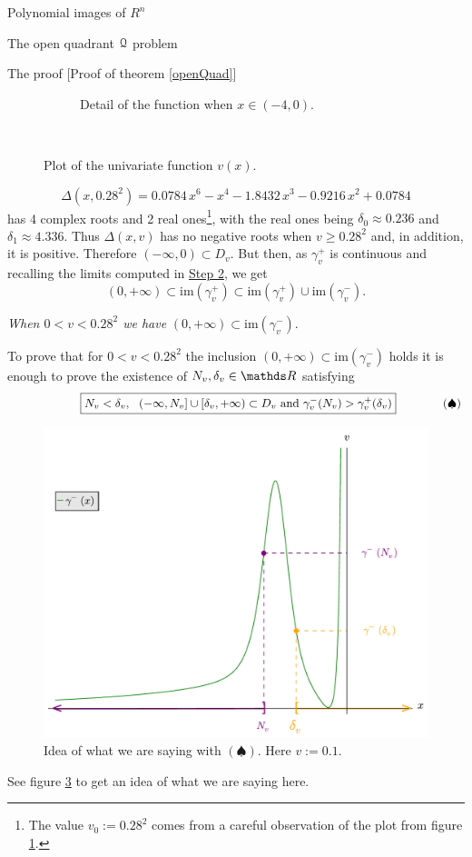 \documentclass[11pt, a4paper, english, twoside, notitlepage, openright]{report}
\begin{document}
\begin{chapter}{Polynomial images of $R^n$}
\begin{section}{The open quadrant $\mathcal{Q}$ problem}
\begin{subsection}{The proof} [Proof of theorem \ref{openQuad}]
\begin{figure}[h]
\begin{subfigure}{.6\linewidth}
\caption{Detail of the function when $x\in(-4,0)$.\label{fig:uveDetail}}
\end{subfigure}\\[1ex]
\caption{Plot of the univariate function $v(x)$.\label{fig:v(x)}}
\end{figure}
$$
\Delta(x,0.28^2)=0.0784\,x^{6}-x^{4}-1.8432\,x^{3}-0.9216\,x^{2}+0.0784
$$ 
has 4 complex roots and 2 real ones\footnote{The value $v_0:=0.28^2$ comes from a careful observation of the plot from figure \ref{fig:uveDetail}.}, with the real ones being $\delta_0\approx 0.236$ and $\delta_1\approx 4.336$. Thus $\Delta(x,v)$ has no negative roots when $v\ge 0.28^2$ and, in addition, it is positive. Therefore $(-\infty,0)\subset D_v$. But then, as $\gamma_v^+$ is continuous and recalling the limits computed in \hyperref[step2]{Step 2}, we get  
$$
(0,+\infty)\subset\text{im}(\gamma_v^+)\subset\text{im}(\gamma_v^+)\cup\text{im}(\gamma_v^-).
$$
\begin{center}
 \emph{When $0<v<0.28^2$ we have} $(0,+\infty)\subset\text{im}(\gamma_v^-)$.
\end{center}
\label{step4}
To prove that for $0<v<0.28^2$ the inclusion $(0,+\infty)\subset\text{im}(\gamma_v^-)$ holds it is enough to prove the existence of $N_v,\delta_v\in\R$ satisfying			
\begin{equation*}\qquad \quad
\qquad\quad\boxed{N_v<\delta_v,\ \ (-\infty,N_v]\cup[\delta_v,+\infty)\subset D_v\text{ and } \gamma_v^-(N_v)>\gamma_v^+(\delta_v)\\
}\qquad \qquad (\spadesuit)
\end{equation*}
\begin{figure}[h]
\centering
\includegraphics[width=1\textwidth]{plots/ch1_12_idea.pdf}
\caption{Idea of what we are saying with $(\spadesuit)$. Here $v:=0.1$.\label{fig:idea}}
\end{figure}
See figure \ref{fig:idea} to get an idea of what we are saying here. 


\end{subsection}
\end{section}
\end{chapter}
\end{document}
